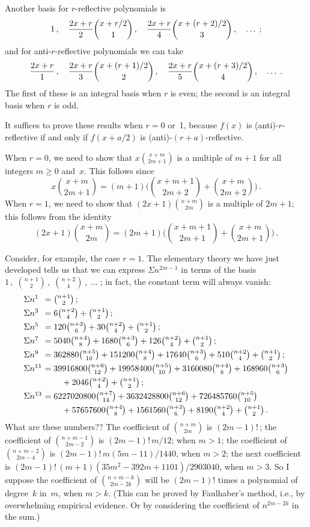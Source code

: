 Another basis for $r$-reflective polynomials is
$$1\,,\quad {2x+r\over 2}{x+r/2\choose 1}\,,\quad {2x+r\over 4}
{x+(r+2)/2\choose 3}\,,\quad\ldots\;;$$
and for anti-$r$-reflective polynomials we can take
$${2x+r\over 1}\,,\quad {2x+r\over 3}{x+(r+1)/2\choose 2}\,,\quad
{2x+r\over 5}{x+(r+3)/2\choose 4}\,,\quad\ldots\;.$$
The first of these is an integral basis when $r$ is even; the second
	is an integral basis when $r$ is odd.

It suffices to prove these results when $r=0$ or~1, because $f(x)$ is
(anti)-$r$-reflective if and only if $f(x+a/2)$ is
(anti)-$(r+a)$-reflective.

When $r=0$, we need to show that $x{x+m\choose 2m+1}$ is a multiple of
$m+1$ for all integers $m\geq 0$ and~$x$. This follows since
$$x{x+m\choose 2m+1}=(m+1)\biggl({x+m+1\choose 2m+2}+{x+m\choose
2m+2}\biggr)\,.$$ 
When $r=1$, we need to show that $(2x+1){x+m\choose 2m}$ is a multiple
of $2m+1$; this follows from the identity
$$(2x+1){x+m\choose 2m}=(2m+1)\biggl({x+m+1\choose 2m+1}+{x+m\choose
2m+1}\biggr)\,.$$ 

Consider, for example, the case $r=1$. The elementary theory we have
just developed tells us that we can express $\Sigma n^{2m-1}$ in terms
of the basis $1\,,\;{n+1\choose 2}\,,\;{n+2\choose 4}\,,\;\ldots\;$;
in fact, the constant term will always vanish:
$$\vcenter{\halign{$#$\hfil\ &$#$\hfil\cr
\Sigma n^1&={n+1\choose 2}\,;\cr
\noalign{\smallskip}
\Sigma n^3&=6{n+2\choose 4}+{n+1\choose 2}\,;\cr
\noalign{\smallskip}
\Sigma n^5&=120{n+3\choose 6}+30{n+2\choose 4}+{n+1\choose 2}\,;\cr
\noalign{\smallskip}
\Sigma n^7&=5040{n+4\choose 8}+1680{n+3\choose 6}+126{n+2\choose 4}+
{n+1\choose 2}\,;\cr
\noalign{\smallskip}
\Sigma n^9&=362880{n+5\choose 10}+151200{n+4\choose 8}
+17640{n+3\choose 6}+510{n+2\choose 4}+{n+1\choose 2}\,;\cr
\noalign{\smallskip}
\Sigma n^{11}&=39916800{n+6\choose 12}+
19958400{n+5\choose 10}+3160080{n+4\choose 8}
+168960{n+3\choose 6}\cr
\noalign{\smallskip}
&\qquad\null+2046{n+2\choose 4}+{n+1\choose 2}\,;\cr
\noalign{\smallskip}
\Sigma n^{13}&=6227020800{n+7\choose 14}+3632428800{n+6\choose 12}+
726485760{n+5\choose 10}\cr
\noalign{\smallskip}
&\qquad\null+57657600{n+4\choose 8}
+1561560{n+3\choose 6}+8190{n+2\choose 4}+{n+1\choose 2}\,.\cr}}$$
What are these numbers?? The coefficient of ${n+m\choose 2m}$ is
$(2m-1)!\,$; the coefficient of ${n+m-1\choose 2m-2}$ is $(2m-1)!\,m/12$;
when $m>1$; the coefficient of ${n+m-2\choose 2m-4}$ is
$(2m-1)!\,m(5m-11)/1440$, when $m>2$; the next coefficient is
$(2m-1)!\,(m+1)(35m^2-392m+1101)/2903040$, when $m>3$. So I suppose the
coefficient of ${n+m-k\choose 2m-2k}$ will be $(2m-1)!$ times a
polynomial of degree~$k$ in~$m$, when $m>k$. (This can be proved by
Faulhaber's method, i.e., by overwhelming empirical evidence. Or by
considering the coefficient of $n^{2m-2k}$ in the sum.)

